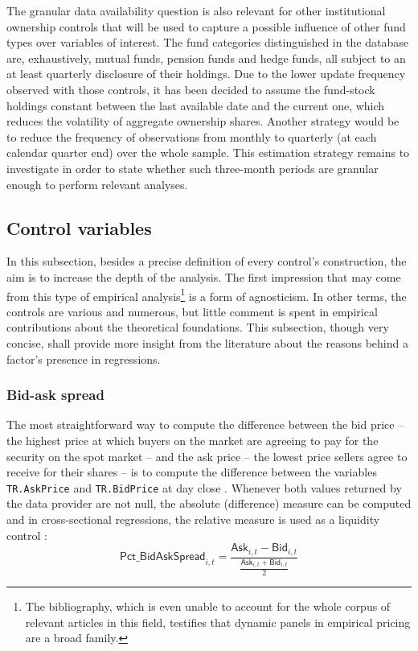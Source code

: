 The granular data availability question is also relevant for other institutional ownership controls that will be used to capture a possible influence of other fund types over variables of interest. The fund categories distinguished in the database are, exhaustively, mutual funds, pension funds and hedge funds, all subject to an at least quarterly disclosure of their holdings. Due to the lower update frequency observed with those controls, it has been decided to assume the fund-stock holdings constant between the last available date and the current one, which reduces the volatility of aggregate ownership shares. Another strategy would be to reduce the frequency of observations from monthly to quarterly (at each calendar quarter end) over the whole sample. This estimation strategy remains to investigate in order to state whether such three-month periods are granular enough to perform relevant analyses.
\subsection{Control variables}
In this subsection, besides a precise definition of every control's construction, the aim is to increase the depth of the analysis. The first impression that may come from this type of empirical analysis\footnote{The bibliography, which is even unable to account for the whole corpus of relevant articles in this field, testifies that dynamic panels in empirical pricing are a broad family.} is a form of agnosticism. In other terms, the controls are various and numerous, but little comment is spent in empirical contributions about the theoretical foundations. This subsection, though very concise, shall provide more insight from the literature about the reasons behind a factor's presence in regressions.
\subsubsection{Bid-ask spread}
The most straightforward way to compute the difference between the bid price -- the highest price at which buyers on the market are agreeing to pay for the security on the spot market -- and the ask price -- the lowest price sellers agree to receive for their shares -- is to compute the difference between the variables \texttt{TR.AskPrice} and \texttt{TR.BidPrice} at day close . Whenever both values returned by the data provider are not null, the absolute (difference) measure can be computed and in cross-sectional regressions, the relative measure is used as a liquidity control :
\begin{equation}
  \mathsf{Pct\_BidAskSpread}_{i, t} = \frac{\mathsf{Ask}_{i, t} - \mathsf{Bid}_{i, t}}{\frac{\mathsf{Ask}_{i, t} + \mathsf{Bid}_{i, t}}{2}}
\end{equation}

